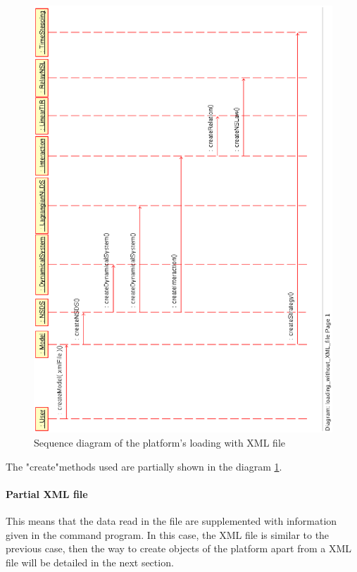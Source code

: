 \begin{figure}
\begin{center}
        \includegraphics[scale=0.75, clip]{figure/platform_loading_XML.ps}
        \caption{Sequence diagram of the platform's loading with XML file}
        \label{fig: platform's loading1}
\end{center}
\end{figure}

The "create"methods used are partially shown in the diagram \ref{fig: platform's loading1}.

\paragraph{Partial XML file}
This means that the data read in the file are supplemented with information given in the command
program.
In this case, the XML file is similar to the previous case, then the way to create objects of
the platform apart from a XML file will be detailed in the next section.




